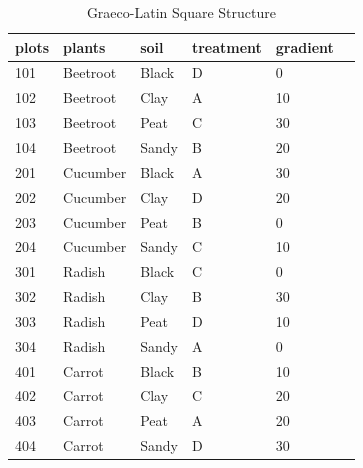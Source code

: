 \documentclass{article}
\begin{document}
\begin{table}[ht]
\centering
\begin{tabular}{llllll}
\toprule
\textbf{plots} & \textbf{plants} & \textbf{soil} & \textbf{treatment} & \textbf{gradient} \\
\midrule
101 & Beetroot  & Black  & D & 0  \\
102 & Beetroot  & Clay   & A & 10 \\
103 & Beetroot  & Peat   & C & 30 \\
104 & Beetroot  & Sandy  & B & 20 \\
201 & Cucumber  & Black  & A & 30 \\
202 & Cucumber  & Clay   & D & 20 \\
203 & Cucumber  & Peat   & B & 0  \\
204 & Cucumber  & Sandy  & C & 10 \\
301 & Radish    & Black  & C & 0  \\
302 & Radish    & Clay   & B & 30 \\
303 & Radish    & Peat   & D & 10 \\
304 & Radish    & Sandy  & A & 0  \\
401 & Carrot    & Black  & B & 10 \\
402 & Carrot    & Clay   & C & 20 \\
403 & Carrot    & Peat   & A & 20 \\
404 & Carrot    & Sandy  & D & 30 \\
\bottomrule
\end{tabular}
\caption{Graeco-Latin Square Structure}
\end{table}
\end{document}
